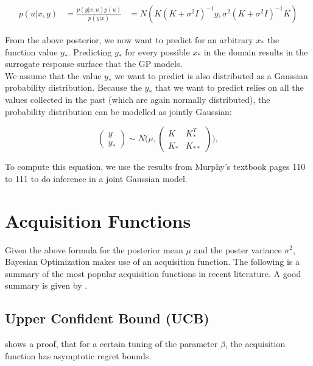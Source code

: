 \begin{align}
p(u | x, y) &= \frac{ p(y | x, u) p(u) }{p(y | x)}
& = N( K(K +\sigma^2 I)^{-1}y, \sigma^2 (K + \sigma^2 I)^{-1} K )
\end{align}

From the above posterior, we now want to predict for an arbitrary $x_*$ the function value $y_*$.
Predicting $y_*$ for every possible $x_*$ in the domain results in the surrogate response surface that the GP models. \\

We assume that the value $y_*$ we want to predict is also distributed as a Gaussian probability distribution. 
Because the $y_*$ that we want to predict relies on all the values collected in the past (which are again normally distributed), the probability distribution can be modelled as jointly Gaussian:

\begin{equation}
\begin{pmatrix} y \\
y_* \end{pmatrix} \sim N\Biggl(\mu,\begin{pmatrix} K & K^T_*\\
 K_* & K_{**} \end{pmatrix}\Biggr),
\end{equation}

To compute this equation, we use the results from Murphy's textbook \citep{Murphy} pages 110 to 111 to do inference in a joint Gaussian model.

\section{Acquisition Functions}

Given the above formula for the posterior mean $\mu$ and the poster variance $\sigma^2$, Bayesian Optimization makes use of an acquisition function.
The following is a summary of the most popular acquisition functions in recent literature.
A good summary is given by \citep{AcquisitionFunctionsMaximizing}.


\subsection{Upper Confident Bound (UCB)}
\citep{UCBRegretProof} shows a proof, that for a certain tuning of the parameter $\beta$, the acquisition function has asymptotic regret bounds.

